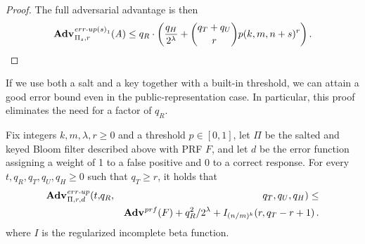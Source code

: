 \begin{proof}
The full adversarial advantage is then
$$\Adv{\erreps_1}_{\struct_s,r}(\advA) \le q_R \cdot \left(\frac{q_H}{2^\lambda} + \binom{q_T+q_U}{r}p(k, m, n+s)^r\right).$$

\end{proof}

If we use both a salt and a key together with a built-in threshold, we can attain a good error bound even in the public-representation case. In particular, this proof eliminates the need for a factor of $q_R$.

\begin{theorem}\label{thm:bf-key-bound}
Fix integers $k, m, \lambda, r\geq 0$ and a threshold $p \in [0,1]$, let $\Pi$ be the salted and keyed Bloom filter described above with PRF $F$, and let $d$ be the error function assigning a weight of 1 to a false positive and 0 to a correct response.
  For every $t, q_R, q_T, q_U, q_H \geq 0$ such that $q_T \geq r$, it holds that
  \begin{eqnarray*}
    \Adv{\errep}_{\struct,r,d}(t,&q_R,& q_T, q_U, q_H) \leq \\ && \Adv{\prf}(F) + q_R^2/2^\lambda + I_{(n/m)^k}(r, q_T-r+1) \,.
  \end{eqnarray*}
where $I$ is the regularized incomplete beta function.
\end{theorem}

